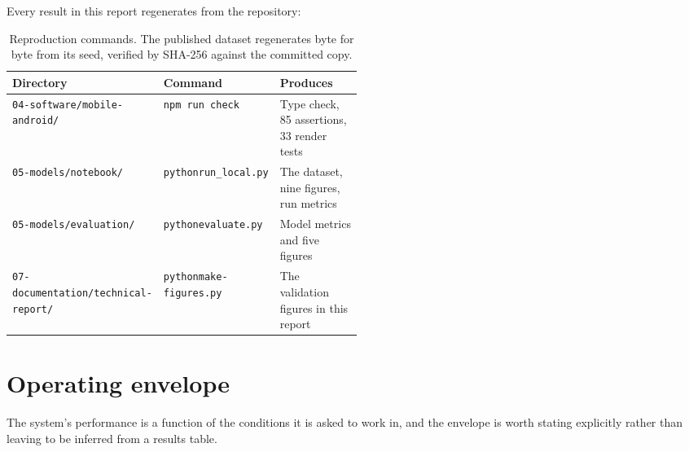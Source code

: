 \documentclass[11pt,a4paper]{article}
\begin{document}
Every result in this report regenerates from the repository:

\begin{table}[htbp]
\centering
\small
\begin{tabularx}{\linewidth}{L{0.27\linewidth}L{0.23\linewidth}Y}
\toprule
\textbf{Directory} & \textbf{Command} & \textbf{Produces} \\
\midrule
\texttt{04-software/}\newline\texttt{mobile-android/}
  & \texttt{npm run check}
  & Type check, 85 assertions, 33 render tests \\
\texttt{05-models/notebook/}
  & \texttt{python}\newline\texttt{run\_local.py}
  & The dataset, nine figures, run metrics \\
\texttt{05-models/evaluation/}
  & \texttt{python}\newline\texttt{evaluate.py}
  & Model metrics and five figures \\
\texttt{07-documentation/}\newline\texttt{technical-report/}
  & \texttt{python}\newline\texttt{make-figures.py}
  & The validation figures in this report \\
\bottomrule
\end{tabularx}
\caption{Reproduction commands. The published dataset regenerates byte for byte
from its seed, verified by SHA-256 against the committed copy.}
\label{tab:repro}
\end{table}

\section{Operating envelope}

The system's performance is a function of the conditions it is asked to work
in, and the envelope is worth stating explicitly rather than leaving to be
inferred from a results table.
\end{document}
